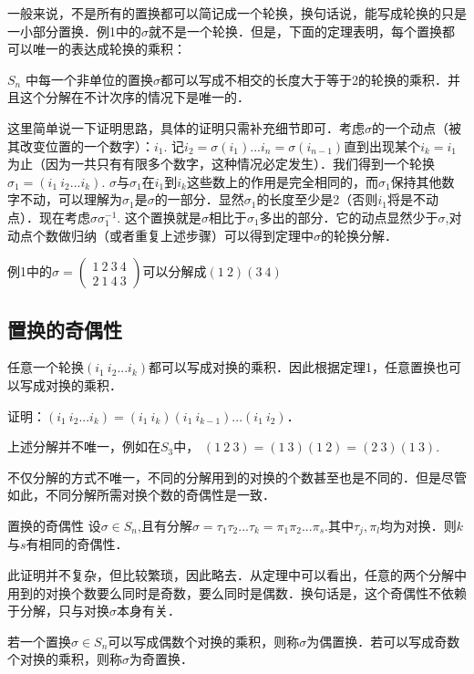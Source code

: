 一般来说，不是所有的置换都可以简记成一个轮换，换句话说，能写成轮换的只是一小部分置换．例1中的$\sigma$就不是一个轮换．但是，下面的定理表明，每个置换都可以唯一的表达成轮换的乘积：
\begin{theorem}{}
$S_n$ 中每一个非单位的置换$\sigma$都可以写成不相交的长度大于等于2的轮换的乘积．并且这个分解在不计次序的情况下是唯一的．
\end{theorem}
这里简单说一下证明思路，具体的证明只需补充细节即可．考虑$\sigma$的一个动点（被其改变位置的一个数字）：$i_1$. 记$i_2=\sigma(i_1)...i_n=\sigma(i_{n-1})$直到出现某个$i_k=i_1$为止（因为一共只有有限多个数字，这种情况必定发生）．我们得到一个轮换$\sigma_1=(i_1\ i_2...i_k)$. $\sigma$与$\sigma_1$在$i_1$到$i_k$这些数上的作用是完全相同的，而$\sigma_1$保持其他数字不动，可以理解为$\sigma_1$是$\sigma$的一部分．显然$\sigma_1$的长度至少是2（否则$i_1$将是不动点）．现在考虑$\sigma\sigma_1^{-1}$. 这个置换就是$\sigma$相比于$\sigma_1$多出的部分．它的动点显然少于$\sigma$,对动点个数做归纳（或者重复上述步骤）可以得到定理中$\sigma$的轮换分解．

\begin{example}{}
例1中的$\sigma=\begin{pmatrix}
1\ 2\ 3\ 4\\ 2\ 1\ 4\ 3
\end{pmatrix}$可以分解成$(1\ 2)(3\ 4)$
\end{example}

\subsection{置换的奇偶性}

\begin{lemma}{}
任意一个轮换$(i_1\ i_2...i_k)$都可以写成对换的乘积．因此根据定理1，任意置换也可以写成对换的乘积．
\end{lemma}
证明：$(i_1\ i_2...i_k)=(i_1\ i_k)(i_1\ i_{k-1})...(i_1\ i_2)$．

\begin{example}{}
上述分解并不唯一，例如在$S_3$中，
$(1\ 2\ 3)=(1\ 3)(1\ 2)=(2\ 3)(1\ 3)$.
\end{example}

不仅分解的方式不唯一，不同的分解用到的对换的个数甚至也是不同的．但是尽管如此，不同分解所需对换个数的奇偶性是一致．

\begin{theorem}{置换的奇偶性}
设$\sigma\in S_n$,且有分解$\sigma=\tau_1\tau_2...\tau_k=\pi_1\pi_2...\pi_s$.其中$\tau_j, \pi_l$均为对换．则$k$与$s$有相同的奇偶性．
\end{theorem}
此证明并不复杂，但比较繁琐，因此略去．从定理中可以看出，任意的两个分解中用到的对换个数要么同时是奇数，要么同时是偶数．换句话是，这个奇偶性不依赖于分解，只与对换$\sigma$本身有关．

\begin{definition}{}
若一个置换$\sigma\in S_n$可以写成偶数个对换的乘积，则称$\sigma$为偶置换．若可以写成奇数个对换的乘积，则称$\sigma$为奇置换．
\end{definition}

